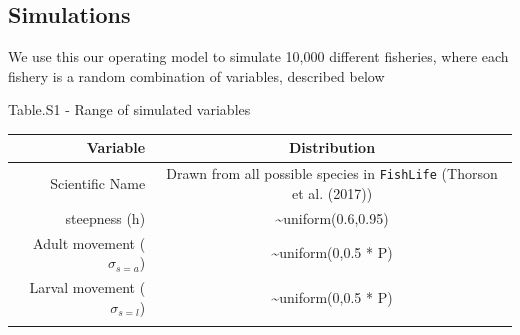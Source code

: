 \documentclass[]{article}
\begin{document}
\hypertarget{simulations}{%
\subsection{Simulations}\label{simulations}}

We use this our operating model to simulate 10,000 different fisheries, where each fishery is a random combination of variables, described below

Table.S1 - Range of simulated variables

\begin{longtable}[]{@{}rc@{}}
\toprule
\begin{minipage}[b]{0.41\columnwidth}\raggedleft
Variable\strut
\end{minipage} & \begin{minipage}[b]{0.53\columnwidth}\centering
Distribution\strut
\end{minipage}\tabularnewline
\midrule
\endhead
\begin{minipage}[t]{0.41\columnwidth}\raggedleft
Scientific Name\strut
\end{minipage} & \begin{minipage}[t]{0.53\columnwidth}\centering
Drawn from all possible species in \texttt{FishLife} (Thorson et al. (2017))\strut
\end{minipage}\tabularnewline
\begin{minipage}[t]{0.41\columnwidth}\raggedleft
steepness (h)\strut
\end{minipage} & \begin{minipage}[t]{0.53\columnwidth}\centering
\textasciitilde uniform(0.6,0.95)\strut
\end{minipage}\tabularnewline
\begin{minipage}[t]{0.41\columnwidth}\raggedleft
Adult movement (\(\sigma_{s=a}\))\strut
\end{minipage} & \begin{minipage}[t]{0.53\columnwidth}\centering
\textasciitilde uniform(0,0.5 * P)\strut
\end{minipage}\tabularnewline
\begin{minipage}[t]{0.41\columnwidth}\raggedleft
Larval movement (\(\sigma_{s=l}\))\strut
\end{minipage} & \begin{minipage}[t]{0.53\columnwidth}\centering
\textasciitilde uniform(0,0.5 * P)\strut
\end{minipage}\tabularnewline
\begin{minipage}[t]{0.41\columnwidth}\raggedleft

\end{minipage}
\end{longtable}
\end{document}
